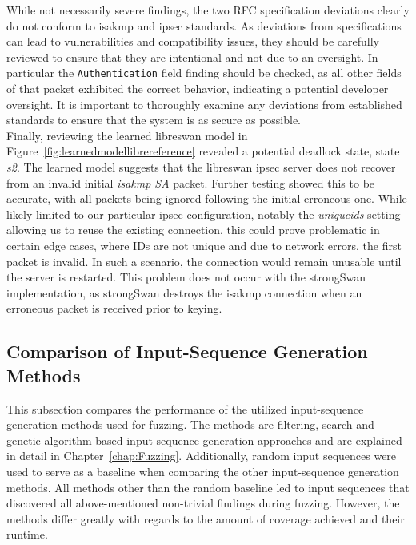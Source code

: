 While not necessarily severe findings, the two RFC specification deviations clearly do not conform to \ac{isakmp} and \ac{ipsec} standards. As deviations from specifications can lead to vulnerabilities and compatibility issues, they should be carefully reviewed to ensure that they are intentional and not due to an oversight. In particular the \texttt{Authentication} field finding should be checked, as all other fields of that packet exhibited the correct behavior, indicating a potential developer oversight. It is important to thoroughly examine any deviations from established standards to ensure that the system is as secure as possible. \\

Finally, reviewing the learned libreswan model in Figure~\ref{fig:learnedmodellibrereference} revealed a potential deadlock state, state \emph{s2}. The learned model suggests that the libreswan \ac{ipsec} server does not recover from an invalid initial \emph{\ac{isakmp} SA} packet. Further testing showed this to be accurate, with all packets being ignored following the initial erroneous one. While likely limited to our particular \ac{ipsec} configuration, notably the \emph{uniqueids} setting allowing us to reuse the existing connection, this could prove problematic in certain edge cases, where IDs are not unique and due to network errors, the first packet is invalid. In such a scenario, the connection would remain unusable until the server is restarted. This problem does not occur with the strongSwan implementation, as strongSwan destroys the \ac{isakmp} connection when an erroneous packet is received prior to keying.
\newpage
\subsection{Comparison of Input-Sequence Generation Methods} \label{subsec:mutation_vs_filtering}
This subsection compares the performance of the utilized input-sequence generation methods used for fuzzing. The methods are filtering, search and genetic algorithm-based input-sequence generation approaches and are explained in detail in Chapter~\ref{chap:Fuzzing}. Additionally, random input sequences were used to serve as a baseline when comparing the other input-sequence generation methods. All methods other than the random baseline led to input sequences that discovered all above-mentioned non-trivial findings during fuzzing. However, the methods differ greatly with regards to the amount of coverage achieved and their runtime. \\

